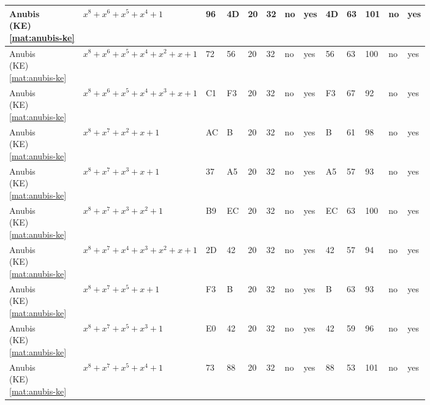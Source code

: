 \begin{tiny}
\begin{longtable}{|l|l|l|l|l|l|l|l|l|l|l|l|l|}
\shortstack{Anubis \\ (KE) \\ \eqref{mat:anubis-ke}} & $x^8 + x^6 + x^5 + x^4 + 1$ & 96 & 4D & 20 & 32 & no & yes & 4D & 63 & 101 & no & yes \\ \hline
\shortstack{Anubis \\ (KE) \\ \eqref{mat:anubis-ke}} & $x^8 + x^6 + x^5 + x^4 + x^2 + x + 1$ & 72 & 56 & 20 & 32 & no & yes & 56 & 63 & 100 & no & yes \\ \hline
\shortstack{Anubis \\ (KE) \\ \eqref{mat:anubis-ke}} & $x^8 + x^6 + x^5 + x^4 + x^3 + x + 1$ & C1 & F3 & 20 & 32 & no & yes & F3 & 67 & 92 & no & yes \\ \hline
\shortstack{Anubis \\ (KE) \\ \eqref{mat:anubis-ke}} & $x^8 + x^7 + x^2 + x + 1$ & AC & B & 20 & 32 & no & yes & B & 61 & 98 & no & yes \\ \hline
\shortstack{Anubis \\ (KE) \\ \eqref{mat:anubis-ke}} & $x^8 + x^7 + x^3 + x + 1$ & 37 & A5 & 20 & 32 & no & yes & A5 & 57 & 93 & no & yes \\ \hline
\shortstack{Anubis \\ (KE) \\ \eqref{mat:anubis-ke}} & $x^8 + x^7 + x^3 + x^2 + 1$ & B9 & EC & 20 & 32 & no & yes & EC & 63 & 100 & no & yes \\ \hline
\shortstack{Anubis \\ (KE) \\ \eqref{mat:anubis-ke}} & $x^8 + x^7 + x^4 + x^3 + x^2 + x + 1$ & 2D & 42 & 20 & 32 & no & yes & 42 & 57 & 94 & no & yes \\ \hline
\shortstack{Anubis \\ (KE) \\ \eqref{mat:anubis-ke}} & $x^8 + x^7 + x^5 + x + 1$ & F3 & B & 20 & 32 & no & yes & B & 63 & 93 & no & yes \\ \hline
\shortstack{Anubis \\ (KE) \\ \eqref{mat:anubis-ke}} & $x^8 + x^7 + x^5 + x^3 + 1$ & E0 & 42 & 20 & 32 & no & yes & 42 & 59 & 96 & no & yes \\ \hline
\shortstack{Anubis \\ (KE) \\ \eqref{mat:anubis-ke}} & $x^8 + x^7 + x^5 + x^4 + 1$ & 73 & 88 & 20 & 32 & no & yes & 88 & 53 & 101 & no & yes \\ \hline

\end{longtable}
\end{tiny}
